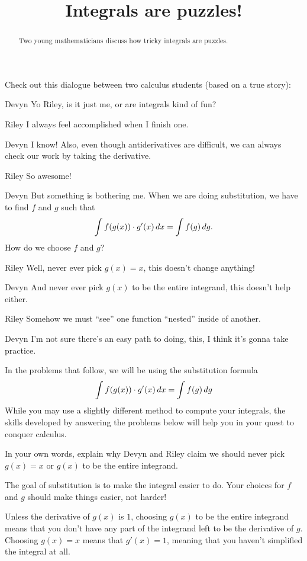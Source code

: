 \documentclass{ximera}
\title[Break-Ground:]{Integrals are puzzles!}
\begin{document}
\begin{abstract}
Two young mathematicians discuss how tricky integrals are puzzles.
\end{abstract}
\maketitle

Check out this dialogue between two calculus students (based on a true
story):

\begin{dialogue}
\item[Devyn] Yo Riley, is it just me, or are integrals kind of fun?
\item[Riley] I always feel accomplished when I finish one.
\item[Devyn] I know! Also, even though antiderivatives are difficult,
  we can always check our work by taking the derivative.
\item[Riley] So awesome!
\item[Devyn] But something is bothering me. When we are doing substitution,
  we have to find $f$ and $g$ such that
  \[
  \int f(g(x)) \cdot g'(x) \mathop{}\!d x = \int f(g) \mathop{}\!d g.
  \]
  How do we choose $f$ and $g$?
\item[Riley] Well, never ever pick $g(x) = x$, this doesn't change
    anything!
\item[Devyn] And never ever pick $g(x)$ to be the entire integrand,
  this doesn't help either.
\item[Riley] Somehow we must ``see'' one function ``nested'' inside of
  another.
\item[Devyn] I'm not sure there's an easy path to doing, this, I think
  it's gonna take practice.
\end{dialogue}


In the problems that follow, we will be using the substitution formula
\[
   \int f(g(x)) \cdot g'(x) \mathop{}\!d x = \int f(g) \mathop{}\!d
   g
\]
While you may use a slightly different method to compute your
integrals, the skills developed by answering the problems below will
help you in your quest to conquer calculus.


\begin{problem}
	In your own words, explain why Devyn and Riley claim we should never 
	pick $g(x) = x$ or $g(x)$ to be the entire integrand.
	\begin{freeResponse}
		The goal of substitution is to make the integral easier to do.  Your choices
		for $f$ and $g$ should make things easier, not harder!
	
		Unless the derivative of $g(x)$ is $1$, choosing $g(x)$ to be the entire
		integrand means that you don't have any part of the integrand left to be
		the derivative of $g$.  Choosing $g(x) = x$ means that $g'(x) = 1$, meaning
		that you haven't simplified the integral at all.  
	\end{freeResponse}
\end{problem}

%
\end{document}
